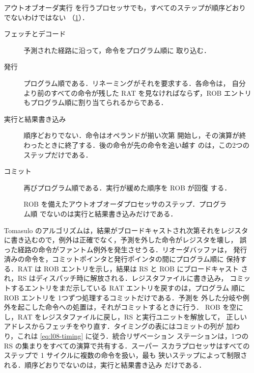 \documentclass[../main.tex]{subfiles}
\begin{document}
アウトオブオーダ実行%
を行うプロセッサでも，すべてのステップが順序どおりでないわけではない
（\cref{fig:l08-order}）．
\begin{description}
  \item[フェッチとデコード] 予測された経路に沿って，命令をプログラム順に
    取り込む．
  \item[発行] プログラム順である．リネーミングがそれを要求する．各命令は，
    自分より前のすべての命令が残した RAT を見なければならず，ROB エントリ
    もプログラム順に割り当てられるからである．
  \item[実行と結果書き込み] 順序どおりでない．命令はオペランドが揃い次第
    開始し，その演算が終わったときに終了する．後の命令が先の命令を追い越す
    のは，この2つのステップだけである．
  \item[コミット] 再びプログラム順である．実行が緩めた順序を ROB が回復
    する．
\end{description}

\begin{figure}[htbp]
  \centering
  
  \caption{ROB を備えたアウトオブオーダプロセッサのステップ．プログラム順
    でないのは実行と結果書き込みだけである．}
  \label{fig:l08-order}
\end{figure}

\begin{keypoint}[章のまとめ]
  Tomasulo のアルゴリズムは，結果がブロードキャストされ次第それをレジスタ
  に書き込むので，例外は正確でなく，予測を外した命令がレジスタを壊し，
  誤った経路の命令がファントム例外を発生させうる．リオーダバッファは，
  発行済みの命令を，コミットポインタと発行ポインタの間にプログラム順に
  保持する．RAT は ROB エントリを示し，結果は RS と ROB にブロードキャスト
  され，RS はディスパッチ時に解放される．レジスタファイルに書き込み，
  コミットするエントリをまだ示している RAT エントリを戻すのは，プログラム
  順に ROB エントリを 1つずつ処理するコミットだけである．予測を
  外した分岐や例外を起こした命令への処置は，それがコミットするときに行う．
  ROB を空にし，RAT をレジスタファイルに戻し，RS と実行ユニットを解放して，
  正しいアドレスからフェッチをやり直す．タイミングの表にはコミットの列が
  加わり，これは \cref{eq:l08-timing} に従う．統合リザベーション
  ステーションは，1つの RS の集まりをすべての演算で共有する．スーパー
  スカラプロセッサはすべてのステップで 1 サイクルに複数の命令を扱い，最も
  狭いステップによって制限される．順序どおりでないのは，実行と結果書き込み
  だけである．
\end{keypoint}
\end{document}
